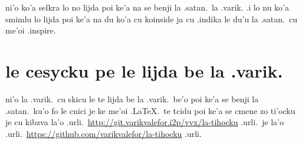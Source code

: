\documentclass{article}
\begin{document}
ni'o ko'a selkra lo no lijda poi ke'a na se benji la .satan.\ la .varik.  .i lo nu ko'a smimlu lo lijda poi ke'a na du ko'a cu koinside ja cu .indika le du'u la .satan.\ cu me'oi .inspire.

\section{le cesycku pe le lijda be la .varik.}
ni'o la .varik.\ cu skicu le te lijda be la .varik.\ be'o poi ke'a se benji la .satan.\ ku'o fo le cnici je ke me'oi .\LaTeX.\ te tcidu poi ke'a se cmene zo ti'ocku je cu kibzva la'o .urli.\ \url{http://git.varikvalefor.i2p/vvx/la-tihocku} .urli.\ je la'o .urli.\ \url{https://github.com/varikvalefor/la-tihocku} .urli.
\end{document}
